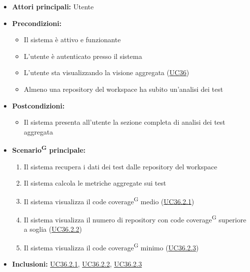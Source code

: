 \documentclass[a4paper, 11pt]{article}
\begin{document}
\begin{itemize}
    \item \textbf{Attori principali:} Utente
    \item \textbf{Precondizioni:}
    \begin{itemize}
        \item Il sistema è attivo e funzionante
        \item L'utente è autenticato presso il sistema
        \item L'utente sta visualizzando la visione aggregata (\hyperref[UC36]{UC36})
        \item Almeno una repository del workspace ha subito un'analisi dei test
    \end{itemize}
    \item \textbf{Postcondizioni:}
    \begin{itemize}
        \item Il sistema presenta all'utente la sezione completa di analisi dei test aggregata
    \end{itemize}
    \item \textbf{Scenario\textsuperscript{G} principale:}
    \begin{enumerate}
        \item Il sistema recupera i dati dei test dalle repository del workspace
        \item Il sistema calcola le metriche aggregate sui test
        \item Il sistema visualizza il code coverage\textsuperscript{G} medio (\hyperref[UC36.2.1]{UC36.2.1})
        \item Il sistema visualizza il numero di repository con code coverage\textsuperscript{G} superiore a soglia (\hyperref[UC36.2.2]{UC36.2.2})
        \item Il sistema visualizza il code coverage\textsuperscript{G} minimo (\hyperref[UC36.2.3]{UC36.2.3})
    \end{enumerate}
    \item \textbf{Inclusioni:} \hyperref[UC36.2.1]{UC36.2.1}, \hyperref[UC36.2.2]{UC36.2.2}, \hyperref[UC36.2.3]{UC36.2.3}
\end{itemize}
\end{document}
